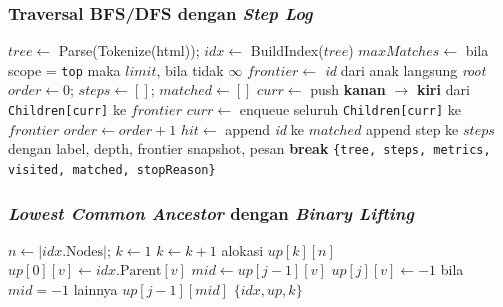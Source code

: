 \subsubsection{Traversal BFS/DFS dengan \textit{Step Log}}

\begin{algorithm}[H]
\caption{AnalyzeTraversal(html, algorithm, sel, scope, limit)}
\begin{algorithmic}[1]
\State $tree \gets$ Parse(Tokenize(html)); $idx \gets$ BuildIndex($tree$)
\State $maxMatches \gets$ bila scope = \texttt{top} maka $limit$, bila tidak $\infty$
\State $frontier \gets$ \textit{id} dari anak langsung \textit{root}
\State $order \gets 0$; $steps \gets []$; $matched \gets []$
        \State $curr \gets$ 
        \State push \textbf{kanan} $\to$ \textbf{kiri} dari \texttt{Children[curr]} ke $frontier$
    \Else
        \State $curr \gets$ 
        \State enqueue seluruh \texttt{Children[curr]} ke $frontier$
    \EndIf
    \State $order \gets order + 1$
    \State $hit \gets$ 
     append \textit{id} ke $matched$ \EndIf
    \State append step ke $steps$ dengan label, depth, frontier snapshot, pesan
     \textbf{break} \EndIf
\EndWhile
\State \Return \texttt{\{tree, steps, metrics, visited, matched, stopReason\}}
\end{algorithmic}
\end{algorithm}

\subsubsection{\textit{Lowest Common Ancestor} dengan \textit{Binary Lifting}}

\begin{algorithm}[H]
\caption{NewLCAEngine(idx)}
\begin{algorithmic}[1]
\State $n \gets |idx.\text{Nodes}|$; $k \gets 1$
 $k \gets k + 1$ \EndWhile
\State alokasi $up[k][n]$
 $up[0][v] \gets idx.\text{Parent}[v]$ \EndFor
{}
        \State $mid \gets up[j-1][v]$
        \State $up[j][v] \gets -1$ bila $mid = -1$ lainnya $up[j-1][mid]$
    \EndFor
\EndFor
\State \Return $\{idx, up, k\}$
\end{algorithmic}
\end{algorithm}

